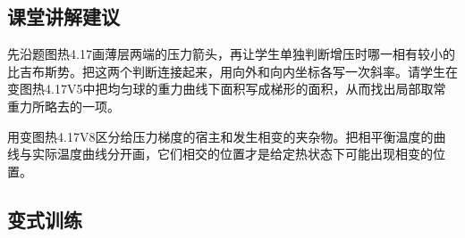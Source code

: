 \documentclass[UTF8,fontset=fandol,a4paper,11pt]{ctexart}
\begin{document}


\subsection*{课堂讲解建议}

先沿题图热4.17画薄层两端的压力箭头，再让学生单独判断增压时哪一相有较小的比吉布斯势。把这两个判断连接起来，用向外和向内坐标各写一次斜率。请学生在变图热4.17V5中把均匀球的重力曲线下面积写成梯形的面积，从而找出局部取常重力所略去的一项。

用变图热4.17V8区分给压力梯度的宿主和发生相变的夹杂物。把相平衡温度的曲线与实际温度曲线分开画，它们相交的位置才是给定热状态下可能出现相变的位置。



\subsection*{变式训练}
\end{document}
